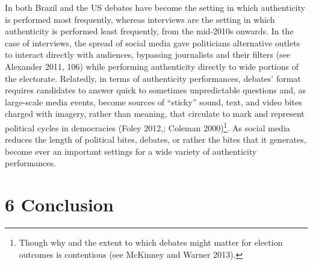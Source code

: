 \documentclass[
  12pt,
]{article}
\begin{document}
In both Brazil and the US debates have become the setting in which
authenticity is performed most frequently, whereas interviews are the
setting in which authenticity is performed least frequently, from the
mid-2010s onwards. In the case of interviews, the spread of social media
gave politicians alternative outlets to interact directly with
audiences, bypassing journalists and their filters (see Alexander 2011,
106) while performing authenticity directly to wide portions of the
electorate. Relatedly, in terms of authenticity performances, debates'
format requires candidates to answer quick to sometimes unpredictable
questions and, as large-scale media events, become sources of ``sticky''
sound, text, and video bites charged with imagery, rather than meaning,
that circulate to mark and represent political cycles in democracies
(Foley 2012,; Coleman 2000)\footnote{Though why and the extent to which
  debates might matter for election outcomes is contentious (see
  McKinney and Warner 2013).}. As social media reduces the length of
political bites, debates, or rather the bites that it generates, become
ever an important settings for a wide variety of authenticity
performances.

\hypertarget{conclusion}{%
\section{6 Conclusion}\label{conclusion}}
\end{document}
